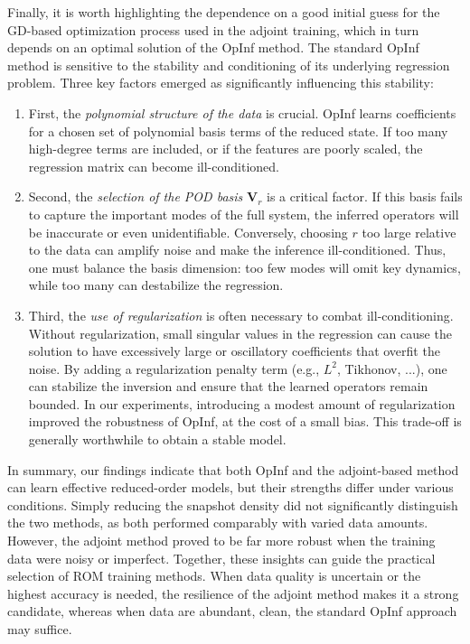 Finally, it is worth highlighting the dependence on a good initial guess for the GD-based optimization process used in the adjoint training, which in turn depends on an optimal solution of the OpInf method. The standard OpInf method is sensitive to the stability and conditioning of its underlying regression problem. Three key factors emerged as significantly influencing this stability:
\begin{enumerate}[label=(\roman*)]
  \item First, the {\it polynomial structure of the data} is crucial. OpInf learns coefficients for a chosen set of polynomial basis terms of the reduced state. If too many high-degree terms are included, or if the features are poorly scaled, the regression matrix can become ill-conditioned.
  \item Second, the {\it selection of the POD basis} $\mathbf{V}_r$ is a critical factor. If this basis fails to capture the important modes of the full system, the inferred operators will be inaccurate or even unidentifiable. Conversely, choosing $r$ too large relative to the data can amplify noise and make the inference ill-conditioned. Thus, one must balance the basis dimension: too few modes will omit key dynamics, while too many can destabilize the regression. 
  \item Third, the {\it use of regularization} is often necessary to combat ill-conditioning. Without regularization, small singular values in the regression can cause the solution to have excessively large or oscillatory coefficients that overfit the noise. By adding a regularization penalty term (e.g., $L^2$, Tikhonov, ...), one can stabilize the inversion and ensure that the learned operators remain bounded. In our experiments, introducing a modest amount of regularization improved the robustness of OpInf, at the cost of a small bias. This trade-off is generally worthwhile to obtain a stable model.
\end{enumerate}


In summary, our findings indicate that both OpInf and the adjoint-based method can learn effective reduced-order models, but their strengths differ under various conditions. Simply reducing the snapshot density did not significantly distinguish the two methods, as both performed comparably with varied data amounts. However, the adjoint method proved to be far more robust when the training data were noisy or imperfect. Together, these insights can guide the practical selection of ROM training methods. When data quality is uncertain or the highest accuracy is needed, the resilience of the adjoint method makes it a strong candidate, whereas when data are abundant, clean, the standard OpInf approach may suffice. 


